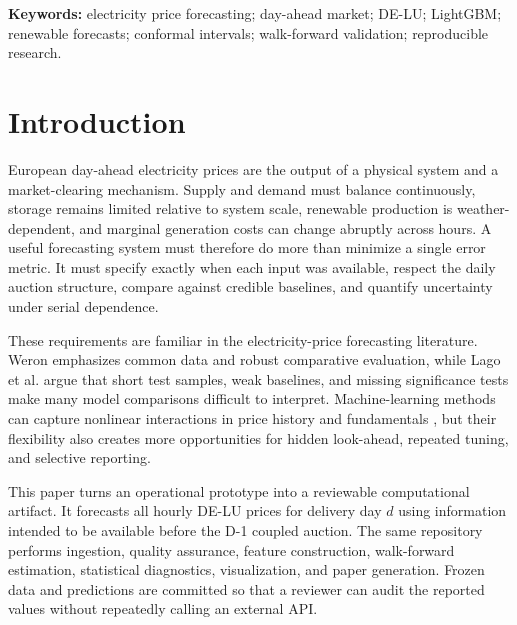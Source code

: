 \documentclass[11pt]{article}
\begin{document}
\begin{abstract}
The contribution is methodological rather than a claim of market dominance:
the repository binds every table and figure to frozen CSV evidence, exposes
data-vintage limitations, includes executable tests, and builds an arXiv
source archive without private data or credentials.
\end{abstract}

\noindent\textbf{Keywords:} electricity price forecasting; day-ahead market;
DE-LU; LightGBM; renewable forecasts; conformal intervals; walk-forward
validation; reproducible research.

\section{Introduction}

European day-ahead electricity prices are the output of a physical system and
a market-clearing mechanism.  Supply and demand must balance continuously,
storage remains limited relative to system scale, renewable production is
weather-dependent, and marginal generation costs can change abruptly across
hours.  A useful forecasting system must therefore do more than minimize a
single error metric.  It must specify exactly when each input was available,
respect the daily auction structure, compare against credible baselines, and
quantify uncertainty under serial dependence.

These requirements are familiar in the electricity-price forecasting
literature.  Weron \cite{weron2014} emphasizes common data and robust
comparative evaluation, while Lago et al. \cite{lago2021} argue that short
test samples, weak baselines, and missing significance tests make many model
comparisons difficult to interpret.  Machine-learning methods can capture
nonlinear interactions in price history and fundamentals
\cite{jedrzejewski2022}, but their flexibility also creates more opportunities
for hidden look-ahead, repeated tuning, and selective reporting.

This paper turns an operational prototype into a reviewable computational
artifact.  It forecasts all hourly DE-LU prices for delivery day $d$ using
information intended to be available before the D-1 coupled auction.  The
same repository performs ingestion, quality assurance, feature construction,
walk-forward estimation, statistical diagnostics, visualization, and paper
generation.  Frozen data and predictions are committed so that a reviewer can
audit the reported values without repeatedly calling an external API.
\end{document}
